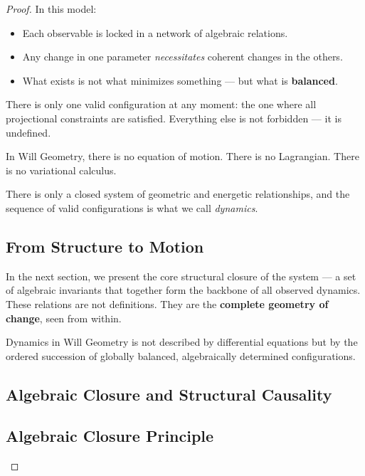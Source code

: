 \documentclass{article}
\begin{document}
\begin{proof}
In this model:

\begin{itemize}
    \item Each observable is locked in a network of algebraic relations.
    \item Any change in one parameter \textit{necessitates} coherent changes in the others.
    \item What exists is not what minimizes something --- but what is \textbf{balanced}.
\end{itemize}

There is only one valid configuration at any moment:  
the one where all projectional constraints are satisfied.  
Everything else is not forbidden — it is undefined.

\begin{tcolorbox}[colback=gray!5, colframe=black!80!black, title=Geometric Principle of Action]
In Will Geometry, there is no equation of motion.  
There is no Lagrangian.  
There is no variational calculus.  

There is only a closed system of geometric and energetic relationships,  
and the sequence of valid configurations is what we call \textit{dynamics}.
\end{tcolorbox}

\subsection*{From Structure to Motion}

In the next section, we present the core structural closure of the system ---  
a set of algebraic invariants that together form the backbone of all observed dynamics.  
These relations are not definitions.  
They are the \textbf{complete geometry of change}, seen from within.

\begin{tcolorbox}[colback=gray!5, colframe=black!80!black, title=Dynamics in Will Geometry]
Dynamics in Will Geometry is not described by differential equations
but by the ordered succession of globally balanced, algebraically determined configurations.
\end{tcolorbox}

\subsection{Algebraic Closure and Structural Causality}

\subsection*{Algebraic Closure Principle}


\end{proof}
\end{document}

